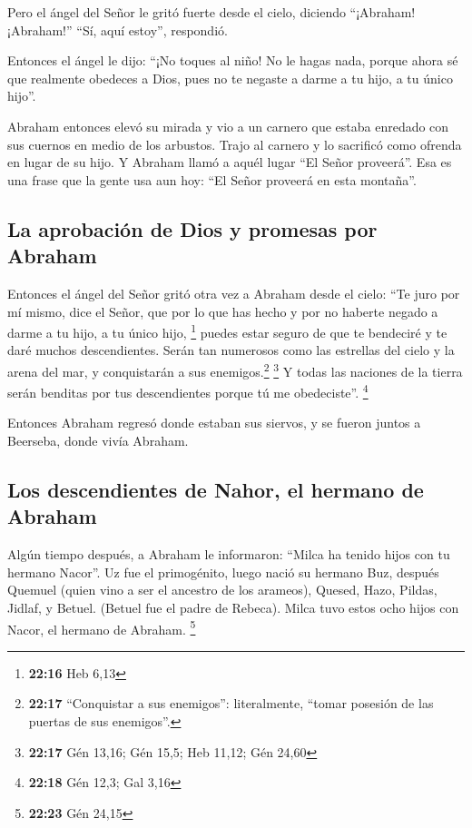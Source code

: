  Pero el ángel del Señor le gritó fuerte desde el cielo,
diciendo ``¡Abraham! ¡Abraham!'' ``Sí, aquí estoy'', respondió.

 Entonces el ángel le dijo: ``¡No toques al niño! No le
hagas nada, porque ahora sé que realmente obedeces a Dios, pues no te
negaste a darme a tu hijo, a tu único hijo''.

 Abraham entonces elevó su mirada y vio a un carnero que
estaba enredado con sus cuernos en medio de los arbustos. Trajo al
carnero y lo sacrificó como ofrenda en lugar de su hijo. 
Y Abraham llamó a aquél lugar ``El Señor proveerá''. Esa es una frase
que la gente usa aun hoy: ``El Señor proveerá en esta montaña''.

\hypertarget{la-aprobaciuxf3n-de-dios-y-promesas-por-abraham}{%
\subsection{La aprobación de Dios y promesas por
Abraham}\label{la-aprobaciuxf3n-de-dios-y-promesas-por-abraham}}

 Entonces el ángel del Señor gritó otra vez a Abraham
desde el cielo:  ``Te juro por mí mismo, dice el Señor,
que por lo que has hecho y por no haberte negado a darme a tu hijo, a tu
único hijo, \footnote{\textbf{22:16} Heb 6,13}  puedes
estar seguro de que te bendeciré y te daré muchos descendientes. Serán
tan numerosos como las estrellas del cielo y la arena del mar, y
conquistarán a sus enemigos.\footnote{\textbf{22:17} ``Conquistar a sus
  enemigos'': literalmente, ``tomar posesión de las puertas de sus
  enemigos''.} \footnote{\textbf{22:17} Gén 13,16; Gén 15,5; Heb 11,12;
  Gén 24,60}  Y todas las naciones de la tierra serán
benditas por tus descendientes porque tú me obedeciste''. \footnote{\textbf{22:18}
  Gén 12,3; Gal 3,16}

 Entonces Abraham regresó donde estaban sus siervos, y se
fueron juntos a Beerseba, donde vivía Abraham.

\hypertarget{los-descendientes-de-nahor-el-hermano-de-abraham}{%
\subsection{Los descendientes de Nahor, el hermano de
Abraham}\label{los-descendientes-de-nahor-el-hermano-de-abraham}}

 Algún tiempo después, a Abraham le informaron: ``Milca
ha tenido hijos con tu hermano Nacor''.  Uz fue el
primogénito, luego nació su hermano Buz, después Quemuel (quien vino a
ser el ancestro de los arameos),  Quesed, Hazo, Pildas,
Jidlaf, y Betuel.  (Betuel fue el padre de Rebeca). Milca
tuvo estos ocho hijos con Nacor, el hermano de Abraham. \footnote{\textbf{22:23}
  Gén 24,15}

